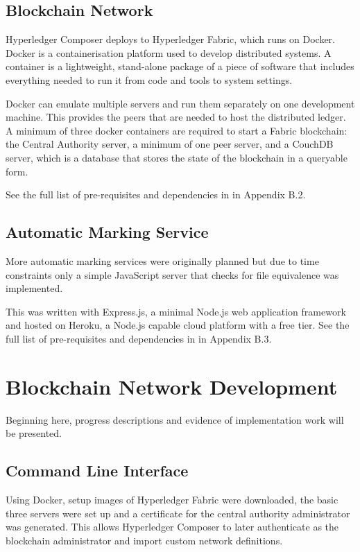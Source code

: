 \subsection{Blockchain Network}

Hyperledger Composer deploys to Hyperledger Fabric, which runs on Docker.
Docker is a containerisation platform used to develop distributed systems.
A container is a lightweight, stand-alone package of a piece of software that includes everything
needed to run it from code and tools to system settings.

Docker can emulate multiple servers and run them separately on one development machine.
This provides the peers that are needed to host the distributed ledger. 
A minimum of three docker containers are required to start a
Fabric blockchain: the Central Authority server, a minimum of one peer server, and a CouchDB server,
which is a database that stores the state of the blockchain in a queryable form.

See the full list of pre-requisites and dependencies in in Appendix B.2.

\subsection{Automatic Marking Service}

More automatic marking services were originally planned but due to time constraints only
a simple JavaScript server that checks for file equivalence was implemented.

This was written with Express.js, a minimal Node.js web application framework and hosted
on Heroku, a Node.js capable cloud platform with a free tier. See the full list of pre-requisites and dependencies in in Appendix B.3.

\section{Blockchain Network Development}

Beginning here, progress descriptions and evidence of implementation work will be presented.

\subsection{Command Line Interface}
Using Docker, setup images of Hyperledger Fabric were downloaded, the basic three servers were set up
and a certificate for the central authority administrator was generated. This allows Hyperledger Composer
to later authenticate as the blockchain administrator and import custom network definitions.

